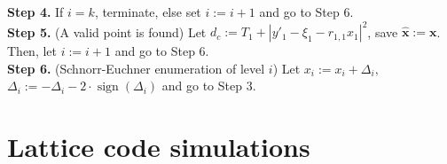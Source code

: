 \documentclass[english,12pt,a4paper,pdftex,sci,utf8]{aaltothesis}
\begin{document}
\noindent \textbf{Step 4.} If $i = k$, terminate, else set $i := i+1$ and go to Step 6.\\

\noindent \textbf{Step 5.} (A valid point is found) Let $d_c := T_1 + \left|y'_1-\xi_1-r_{1,1}x_1\right|^2$, save $\mathbf{\hat{x}} := \mathbf{x}$. \\
\indent Then, let $i := i+1$ and go to Step 6.\\

\noindent \textbf{Step 6.} (Schnorr-Euchner enumeration of level $i$) Let $x_i := x_i + \Delta_i,$\\
\indent $\Delta_i := -\Delta_i - 2\cdot\operatorname{sign}(\Delta_i)  $ and go to Step 3.\\

\clearpage

\section{Lattice code simulations}
\end{document}
